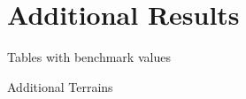 \section{Additional Results}
  \begin{notes}
   	\item Tables with benchmark values
   	\item Additional Terrains
  \end{notes}